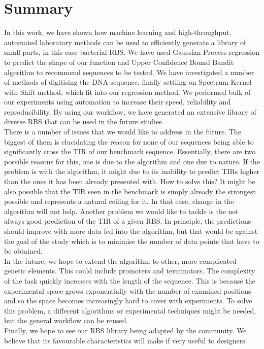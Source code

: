 \documentclass{article}
\begin{document}
\section{Summary}

In this work, we have shown how machine learning and high-throughput, automated laboratory methods can be used to efficiently generate a library of small parts, in this case bacterial RBS. 
We have used Gaussian Process regression to predict the shape of our function and Upper Confidence Bound Bandit algorithm to recommend sequences to be tested.
We have investigated a number of methods of digitising the DNA sequence, finally settling on Spectrum Kernel with Shift method, which fit into our regression method.
We performed bulk of our experiments using automation to increase their speed, reliability and reproducibility.
By using our workflow, we have generated an extensive library of diverse RBS that can be used in the future studies.\\
There is a number of issues that we would like to address in the future.
The biggest of them is elucidating the reason for none of our sequences being able to significantly cross the TIR of our benchmark sequence.
Essentially, there are two possible reasons for this, one is due to the algorithm and one due to nature.
If the problem is with the algorithm, it might due to its inability to predict TIRs higher than the ones it has been already presented with.
How to solve this?
It might be also possible that the TIR seen in the benchmark is simply already the strongest possible and represents a natural ceiling for it. 
In that case, change in the algorithm will not help.
Another problem we would like to tackle is the not always good prediction of the TIR of a given RBS.
In principle, the predictions should improve with more data fed into the algorithm, but that would be against the goal of the study which is to minimise the number of data points that have to be obtained.\\
In the future, we hope to extend the algorithm to other, more complicated genetic elements.
This could include promoters and terminators.
The complexity of the task quickly increases with the length of the sequence.
This is because the experimental space grows exponentially with the number of examined positions and so the space becomes increasingly hard to cover with experiments.
To solve this problem, a different algorithms or experimental techniques might be needed, but the general workflow can be reused.\\
Finally, we hope to see our RBS library being adapted by the community.
We believe that its favourable characteristics will make if very useful to designers.
\end{document}
